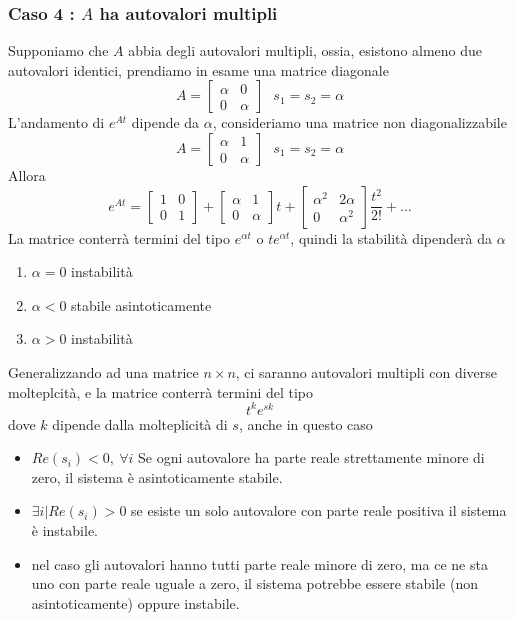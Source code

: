 \documentclass[10pt, letterpaper]{report}
\begin{document}
\subsubsection{Caso 4 : $A$ ha autovalori multipli}
Supponiamo che $A$ abbia degli autovalori multipli, 
ossia, esistono almeno due autovalori identici, prendiamo in 
esame una matrice diagonale
$$ A=\begin{bmatrix}
    \alpha & 0 \\ 0 &\alpha 
\end{bmatrix}\ \ \ s_1=s_2=\alpha$$ 
L'andamento di $e^{At}$ dipende da $\alpha$, consideriamo 
una matrice non diagonalizzabile 
$$ A=\begin{bmatrix}
    \alpha & 1 \\ 0 &\alpha 
\end{bmatrix}\ \ \ s_1=s_2=\alpha$$
Allora 
$$ e^{At}=\begin{bmatrix}
    1 & 0 \\ 0 & 1
\end{bmatrix}+ 
\begin{bmatrix}
    \alpha & 1 \\ 0 & \alpha
\end{bmatrix}t+ \begin{bmatrix}
    \alpha^2 & 2\alpha \\ 0 & \alpha^2
\end{bmatrix}\frac{t^2}{2!}+\dots$$ 
La matrice conterrà termini del tipo $e^{\alpha t}$ o 
$te^{\alpha t}$, quindi la stabilità dipenderà da $\alpha$
\begin{enumerate}
    \item $\alpha=0$ instabilità 
    \item $\alpha<0$ stabile asintoticamente 
    \item $\alpha > 0 $ instabilità
\end{enumerate}
Generalizzando ad una matrice $n\times n$, ci saranno 
autovalori multipli con diverse molteplcità, 
e la matrice conterrà termini del tipo 
$$t^ke^{sk}$$ 
dove $k$ dipende dalla molteplicità di $s$, anche 
in questo caso \begin{itemize}
    \item  $Re(s_i)< 0, \ \forall i$ Se ogni autovalore ha parte 
    reale strettamente minore di zero, il sistema è asintoticamente stabile.
    \item $\exists i | Re(s_i)>0$ se esiste un solo autovalore con parte 
    reale positiva il sistema è instabile.
    \item nel caso gli autovalori hanno tutti parte reale 
    minore di zero, ma ce ne sta uno con parte reale uguale a 
    zero, il sistema potrebbe essere stabile (non asintoticamente) 
    oppure instabile.
\end{itemize}
\end{document}
